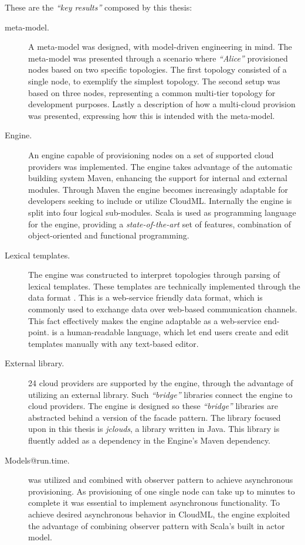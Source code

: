 These are the \emph{``key results''} composed by this thesis:
\begin{description}
  \item[meta-model.]
    A meta-model was designed, with model-driven engineering in mind.
    The meta-model was presented through a scenario where \emph{``Alice''}
    provisioned nodes based on two specific topologies.
    The first topology consisted of a single node, to exemplify the simplest topology.
    The second setup was based on three nodes, representing a common multi-tier
    topology for development purposes.
    Lastly a description of how a multi-cloud provision was presented, 
    expressing how this is intended with the meta-model.
  \item[Engine.]
    An engine capable of provisioning nodes on a set of supported cloud providers
    was implemented.
    The engine takes advantage of the automatic building system Maven,
    enhancing the support for internal and external modules.
    Through Maven the engine becomes increasingly adaptable for developers
    seeking to include or utilize CloudML.
    Internally the engine is split into four logical sub-modules.
    Scala is used as programming language for the engine,
    providing a \emph{state-of-the-art} set of features,
    \eg combination of object-oriented and functional programming.
  \item[Lexical templates.]
    The engine was constructed to interpret topologies through parsing of lexical templates.
    These templates are technically implemented through the data format .
    This is a web-service friendly data format, which is commonly used to exchange data
    over web-based communication channels.
    This fact effectively makes the engine adaptable as a web-service end-point.
     is a human-readable language, which let end users create and edit
    templates manually with any text-based editor.
  \item[External library.]
    24 cloud providers are supported by the engine, through the advantage of 
    utilizing an external library.
    Such \emph{``bridge''} libraries connect the engine to cloud providers.
    The engine is designed so these \emph{``bridge''} libraries are abstracted
    behind a version of the facade pattern.
    The library focused upon in this thesis is \emph{jclouds},
    a library written in Java.
    This library is fluently added as a dependency in the Engine's Maven dependency.
  \item[Models@run.time.]
     was utilized and combined with observer pattern to
    achieve asynchronous provisioning.
    As provisioning of one single node can take up to minutes to complete it was
    essential to implement asynchronous functionality.
    To achieve desired asynchronous behavior in CloudML,
    the engine exploited the advantage of combining observer pattern with Scala's
    built in actor model.
\end{description}
